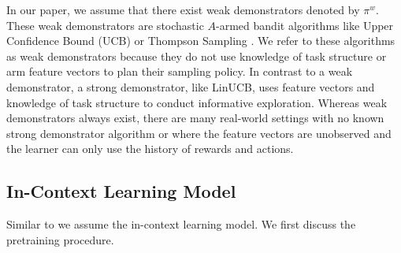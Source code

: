In our paper, we assume that there exist weak demonstrators denoted by $\pi^{w}$. These weak demonstrators are stochastic $A$-armed bandit algorithms like Upper Confidence Bound (UCB)  \citep{auer2002finite-time, auer2010ucb} or Thompson Sampling \citep{thompson1933likelihood,agrawal2012analysis,russo2018tutorial,zhu2020thompson}.
% 
We refer to these algorithms as weak demonstrators because they do not use knowledge of task structure or arm feature vectors to plan their sampling policy.
% 
In contrast to a weak demonstrator, a strong demonstrator, like LinUCB, uses feature vectors and knowledge of task structure to conduct informative exploration.
% 
Whereas weak demonstrators always exist, there are many real-world settings with no known strong demonstrator algorithm or where the feature vectors are unobserved and the learner can only use the history of rewards and actions. 
%
%
%
%

\vspace*{-1em}
\subsection{In-Context Learning Model}
\label{sec:learning-model}
\vspace*{-0.7em}


Similar to \citet{lee2023supervised, sinii2023context, lin2023transformers, ma2023rethinking, liu2023reason, liu2023self} we assume the in-context learning model. We first discuss the pretraining procedure.

